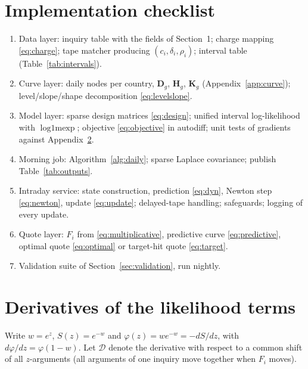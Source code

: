 \documentclass[11pt,a4paper]{article}
\theoremstyle{definition}
\theoremstyle{remark}
\newcommand{\lmexp}{\operatorname{log1mexp}}
\begin{document}
\section{Implementation checklist}
\begin{enumerate}[itemsep=2pt]
\item Data layer: inquiry table with the fields of Section~1; charge mapping \eqref{eq:charge}; tape matcher producing $(c_i,\delta_i,\rho_i)$; interval table (Table~\ref{tab:intervals}).
\item Curve layer: daily nodes per country, $\bm D_g$, $\bm H_g$, $\bm K_g$ (Appendix~\ref{app:curve}); level/slope/shape decomposition \eqref{eq:levelslope}.
\item Model layer: sparse design matrices \eqref{eq:design}; unified interval log-likelihood with $\lmexp$; objective \eqref{eq:objective} in autodiff; unit tests of gradients against Appendix~\ref{app:derivatives}.
\item Morning job: Algorithm~\ref{alg:daily}; sparse Laplace covariance; publish Table~\ref{tab:outputs}.
\item Intraday service: state construction, prediction \eqref{eq:dyn}, Newton step \eqref{eq:newton}, update \eqref{eq:update}; delayed-tape handling; safeguards; logging of every update.
\item Quote layer: $F_i$ from \eqref{eq:multiplicative}, predictive curve \eqref{eq:predictive}, optimal quote \eqref{eq:optimal} or target-hit quote \eqref{eq:target}.
\item Validation suite of Section~\ref{sec:validation}, run nightly.
\end{enumerate}

\appendix
\section{Derivatives of the likelihood terms}\label{app:derivatives}
Write $w=e^{z}$, $S(z)=e^{-w}$ and $\varphi(z)=we^{-w}=-dS/dz$, with $d\varphi/dz=\varphi(1-w)$. Let $\mathcal D$ denote the derivative with respect to a common shift of all $z$-arguments (all arguments of one inquiry move together when $F_i$ moves).
\end{document}
